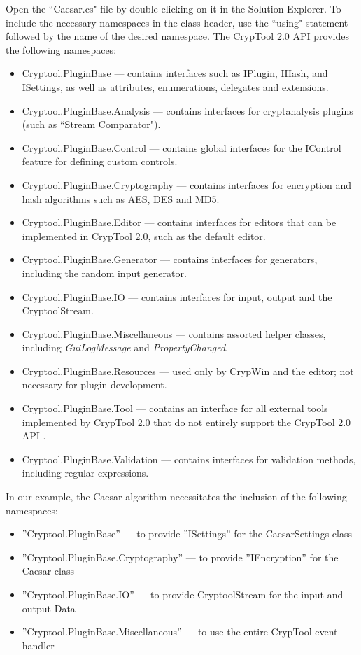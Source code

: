 Open the ``Caesar.cs" file by double clicking on it in the Solution Explorer. To include the necessary namespaces in the class header, use the ``using" statement followed by the name of the desired namespace. The CrypTool 2.0 API provides the following namespaces:

\begin{itemize}
	\item Cryptool.PluginBase --- contains interfaces such as IPlugin, IHash, and ISettings, as well as attributes, enumerations, delegates and extensions.
	\item Cryptool.PluginBase.Analysis --- contains interfaces for cryptanalysis plugins (such as ``Stream Comparator").
	\item Cryptool.PluginBase.Control --- contains global interfaces for the IControl feature for defining custom controls.
	\item Cryptool.PluginBase.Cryptography --- contains interfaces for encryption and hash algorithms such as AES, DES and MD5.
	\item Cryptool.PluginBase.Editor --- contains interfaces for editors that can be implemented in CrypTool 2.0, such as the default editor.
	\item Cryptool.PluginBase.Generator --- contains interfaces for generators, including the random input generator.
	\item Cryptool.PluginBase.IO --- contains interfaces for input, output and the CryptoolStream.
	\item Cryptool.PluginBase.Miscellaneous --- contains assorted helper classes, including \textit{GuiLogMessage} and \textit{PropertyChanged}.
	\item Cryptool.PluginBase.Resources --- used only by CrypWin and the editor; not necessary for plugin development.
	\item Cryptool.PluginBase.Tool --- contains an interface for all external tools implemented by CrypTool 2.0 that do not entirely support the CrypTool 2.0 API .
	\item Cryptool.PluginBase.Validation --- contains interfaces for validation methods, including regular expressions.
\end{itemize}

In our example, the Caesar algorithm necessitates the inclusion of the following namespaces:

\begin{itemize}
	\item ''Cryptool.PluginBase'' --- to provide ''ISettings'' for the CaesarSettings class
	\item ''Cryptool.PluginBase.Cryptography'' --- to provide ''IEncryption'' for the Caesar class
	\item ''Cryptool.PluginBase.IO'' --- to provide CryptoolStream for the input and output Data
	\item ''Cryptool.PluginBase.Miscellaneous'' --- to use the entire CrypTool event handler
\end{itemize}

